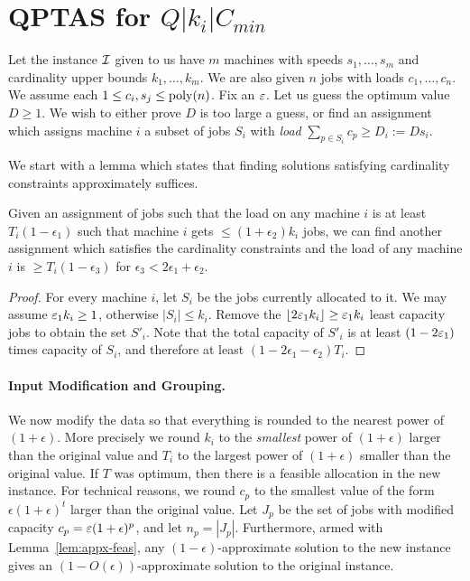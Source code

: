 \newpage
\section{QPTAS for $Q|k_i|C_{min}$}
\def\pv{\mathbf{b}}
\renewcommand{\dem}{\mathsf{cap}}
Let the instance ${\cal I}$ given to us have $m$ machines with speeds $s_1,\ldots, s_m$ and cardinality upper bounds $k_1,\ldots,k_m$. We are also given $n$ jobs with loads $c_1,\ldots,c_n$. We assume each $1\leq c_i,s_j \leq \mathrm{poly}(n)$.
Fix an $\varepsilon$. 
Let us guess the optimum value $D\geq 1$.  We wish to either prove $D$ is too large a guess, or find an assignment which assigns machine $i$ a subset of jobs $S_i$ with {\em load} $\sum_{p\in S_i} c_p \geq D_i := Ds_i$.


We start with a lemma which states that finding solutions satisfying cardinality constraints approximately suffices.
\begin{lemma}\label{lem:appx-feas}
	Given an assignment of jobs such that the load on any machine $i$  is at least $T_i(1 - \epsilon_1)$ such that machine $i$ gets $\leq (1+\epsilon_2)k_i$ jobs, 
	we can find another assignment which satisfies the cardinality constraints and the load of any machine $i$ is $\geq T_i(1 - \epsilon_3)$ for $\epsilon_3 < 2\epsilon_1+\epsilon_2$.
\end{lemma}
\begin{proof}
For every machine $i$, let $S_i$ be the jobs currently allocated to it. We may assume $\varepsilon_1 k_i \geq 1$, otherwise $|S_i| \leq k_i$.
Remove the $\lfloor2\varepsilon_1 k_i\rfloor \geq \varepsilon_1 k_i$ least capacity jobs to obtain the set $S'_i$. Note that the total capacity of $S'_i$ is at least $(1-2\varepsilon_1)$ times capacity of $S_i$, and therefore
at least $(1-2\epsilon_1 - \epsilon_2)T_i$. 
\end{proof}
\noindent
\paragraph{Input Modification and Grouping.}
We now modify the data so that everything is rounded to the nearest power of $(1+\epsilon)$. More precisely we round  $k_i$  to the {\em smallest} power of $(1+\epsilon)$ larger than the original value and $T_i$ to the largest power of $(1+\epsilon)$ smaller than the original value.
If $T$ was optimum, then there is a feasible allocation in the new instance. 
For technical reasons, we round $c_p$ to the smallest value of the form $\epsilon(1+\epsilon)^t$ larger than the original value.
Let $J_p$ be the set of jobs with modified capacity $c_p = \varepsilon (1+\epsilon)^p$, and let $n_p = |J_p|$. Furthermore, armed with Lemma~\ref{lem:appx-feas}, any $(1-\epsilon)$-approximate solution to the new instance gives an $(1-O(\epsilon))$-approximate solution to the original instance.  \smallskip


